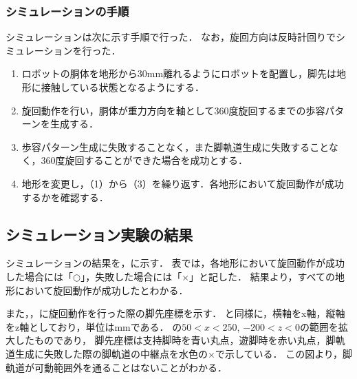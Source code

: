\subsubsection{シミュレーションの手順}
シミュレーションは次に示す手順で行った．
なお，旋回方向は反時計回りでシミュレーションを行った．
\begin{enumerate}
  \item ロボットの胴体を地形から30mm離れるようにロボットを配置し，脚先は地形に接触している状態となるようにする．
  \item 旋回動作を行い，胴体が重力方向を軸として360度旋回するまでの歩容パターンを生成する．
  \item 歩容パターン生成に失敗することなく，また脚軌道生成に失敗することなく，360度旋回することができた場合を成功とする．
  \item 地形を変更し，（1）から（3）を繰り返す．各地形において旋回動作が成功するかを確認する．
\end{enumerate}

\subsection{シミュレーション実験の結果}
シミュレーションの結果を，に示す．
表では，各地形において旋回動作が成功した場合には「$\bigcirc$」，失敗した場合には「$\times$」と記した．
結果より，すべての地形において旋回動作が成功したとわかる．

また，，に旋回動作を行った際の脚先座標を示す．
と同様に，横軸をx軸，縦軸をz軸としており，単位はmmである．
の$50 < x < 250$, $−200 < z < 0$の範囲を拡大したものであり，
脚先座標は支持脚時を青い丸点，遊脚時を赤い丸点，脚軌道生成に失敗した際の脚軌道の中継点を水色の$\times$で示している．
この図より，脚軌道が可動範囲外を通ることはないことがわかる．
\\

